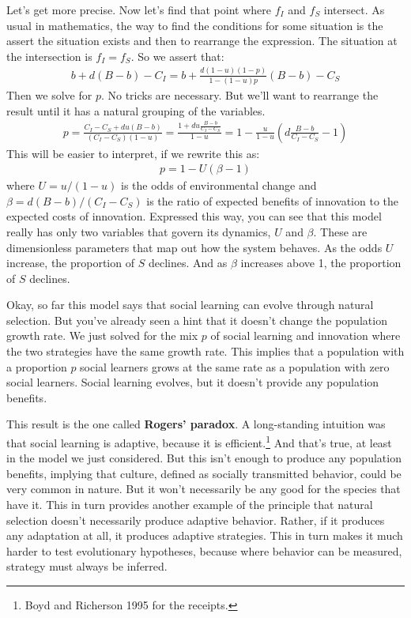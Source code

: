 \documentclass[10pt,reqno]{amsbook}
\newcommand{\bemph}[1]{{\textbf{\textcolor{bemphcol}{#1}}}}
\numberwithin{equation}{chapter}
\begin{document}
Let's get more precise. Now let's find that point where $f_I$ and $f_S$ intersect. As usual in mathematics, the way to find the conditions for some situation is the assert the situation exists and then to rearrange the expression. The situation at the intersection is $f_I = f_S$. So we assert that:
\begin{align*}
	b + d(B-b) - C_I = b + \frac{d(1-u)(1-p)}{1-(1-u)p} (B-b) - C_S
\end{align*}
Then we solve for $p$. No tricks are necessary. But we'll want to rearrange the result until it has a natural grouping of the variables.
\begin{align*}
	p = \frac{C_I-C_S + du(B-b)}{(C_I-C_S)(1-u)} = \frac{1 + du \frac{B-b}{C_I-C_S}}{1-u} = 1 - \frac{u}{1-u} \left( d \frac{B-b}{C_I-C_S} - 1 \right)
\end{align*}
This will be easier to interpret, if we rewrite this as:
\begin{align*}
	p = 1 - U ( \beta - 1 )
\end{align*}
where $U = u/(1-u)$ is the odds of environmental change and $\beta=d(B-b)/(C_I-C_S)$ is the ratio of expected benefits of innovation to the expected costs of innovation. Expressed this way, you can see that this model really has only two variables that govern its dynamics, $U$ and $\beta$. These are dimensionless parameters that map out how the system behaves. As the odds $U$ increase, the proportion of $S$ declines. And as $\beta$ increases above 1, the proportion of $S$ declines. 

Okay, so far this model says that social learning can evolve through natural selection. But you've already seen a hint that it doesn't change the population growth rate. We just solved for the mix $p$ of social learning and innovation where the two strategies have the same growth rate. This implies that a population with a proportion $p$ social learners grows at the same rate as a population with zero social learners. Social learning evolves, but it doesn't provide any population benefits.

This result is the one called \bemph{Rogers' paradox}. A long-standing intuition was that social learning is adaptive, because it is efficient.\footnote{Boyd and Richerson 1995 for the receipts.} And that's true, at least in the model we just considered. But this isn't enough to produce any population benefits, implying that culture, defined as socially transmitted behavior, could be very common in nature. But it won't necessarily be any good for the species that have it. This in turn provides another example of the principle that natural selection doesn't necessarily produce adaptive behavior. Rather, if it produces any adaptation at all, it produces adaptive strategies. This in turn makes it much harder to test evolutionary hypotheses, because where behavior can be measured, strategy must always be inferred.
\end{document}
